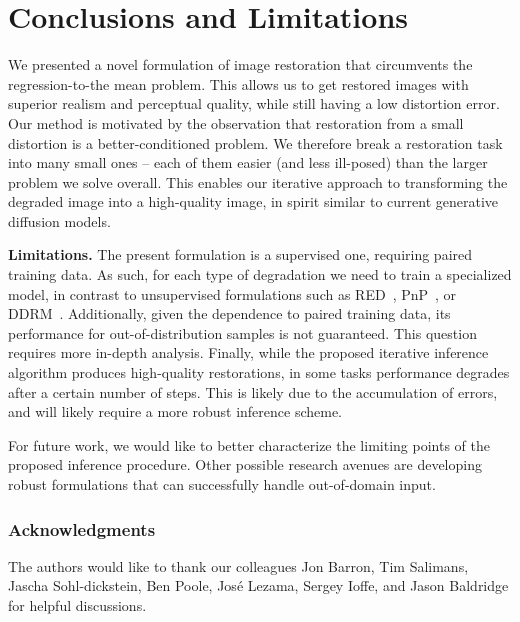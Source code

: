 \documentclass[10pt]{article} %
\begin{document}
\section{Conclusions and Limitations}
We presented a novel formulation of image restoration that circumvents the regression-to-the mean problem. This allows us to get restored images with superior realism and perceptual quality, while still having a low distortion error. Our method is motivated by the observation that restoration from a small distortion is a better-conditioned problem. We therefore break a restoration task into many small ones -- each of them easier (and less ill-posed) than the larger problem we solve overall. This enables our iterative approach to transforming the degraded image into a high-quality image, in spirit similar to current generative diffusion models.

\noindent \textbf{Limitations.} The present formulation is a supervised one, requiring paired training data. As such, for each type of degradation we need to train a specialized model, in contrast to unsupervised formulations such as RED~\citep{romano2017little}, PnP~\citep{venkatakrishnan2013plug,kamilov2022plug}, or DDRM~\citep{kawar2022denoising}. 
Additionally, given the dependence to paired training data, its performance for out-of-distribution samples is not guaranteed. This question requires more in-depth analysis. 
Finally, while the proposed iterative inference algorithm produces high-quality restorations, in some tasks performance degrades after a certain number of steps. This is likely due to the accumulation of errors, and will likely require a more robust inference scheme. 

For future work, we would like to better characterize the limiting points of the proposed inference procedure. Other possible research avenues are developing robust formulations that can  successfully handle out-of-domain input. 











\subsubsection*{Acknowledgments}
The authors would like to thank our colleagues Jon Barron, Tim Salimans, 
Jascha Sohl-dickstein, Ben Poole, José Lezama, Sergey Ioffe, and Jason Baldridge for helpful discussions. 
\end{document}
